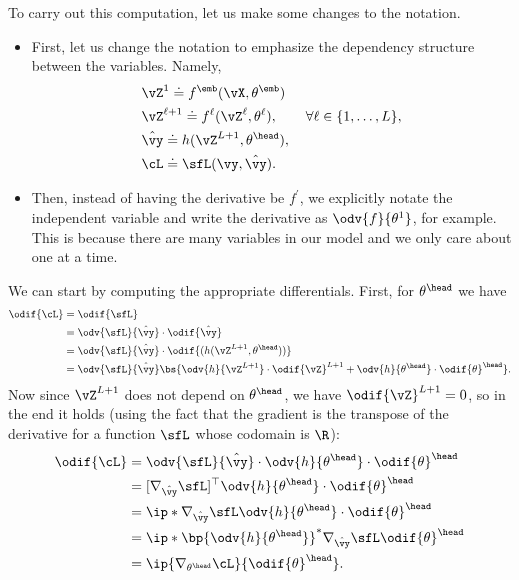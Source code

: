 \documentclass[../../book-main.tex]{subfiles}
\begin{document}
To carry out this computation, let us make some changes to the notation. 
\begin{itemize}
    \item First, let us change the notation to emphasize the dependency structure between the variables. Namely, 
    \begin{align}
        &\vZ^{1} \doteq f^{\emb}(\vX, \theta^{\emb}) \\ 
        &\vZ^{\ell + 1} \doteq f^{\ell}(\vZ^{\ell}, \theta^{\ell}), \qquad \forall \ell \in \{1, \dots, L\}, \\
        &\hat{\vy} \doteq h(\vZ^{L+1}, \theta^{\head}), \\ 
        &\cL \doteq \sfL(\vy, \hat{\vy}).
    \end{align}
    \item Then, instead of having the derivative be \(f^{\prime}\), we explicitly notate the independent variable and write the derivative as \(\odv{f}{\theta^{1}}\), for example. This is because there are many variables in our model and we only care about one at a time.
\end{itemize}
We can start by computing the appropriate differentials. First, for \(\theta^{\head}\) we have
\begin{align}
    \odif{\cL}
    &= \odif{\sfL} \\ 
    &= \odv{\sfL}{\hat{\vy}}\cdot\odif{\hat{\vy}} \\ 
    &= \odv{\sfL}{\hat{\vy}}\cdot\odif{{(h(\vZ^{L + 1}, \theta^{\head}))}} \\ 
    &= \odv{\sfL}{\hat{\vy}}\bs{\odv{h}{\vZ^{L + 1}}\cdot\odif{\vZ}^{L + 1} + \odv{h}{\theta^{\head}}\cdot\odif{\theta}^{\head}}.
\end{align}
Now since \(\vZ^{L + 1}\) does not depend on \(\theta^{\head}\), we have \(\odif{\vZ}^{L + 1} = 0\), so in the end it holds (using the fact that the gradient is the transpose of the derivative for a function \(\sfL\) whose codomain is \(\R\)):
\begin{align}
    \odif{\cL} 
    &= \odv{\sfL}{\hat{\vy}}\cdot\odv{h}{\theta^{\head}}\cdot\odif{\theta}^{\head} \\ 
    &= [\nabla_{\hat{\vy}}\sfL]^{\top}\odv{h}{\theta^{\head}}\cdot\odif{\theta}^{\head} \\ 
    &= \ip*{\nabla_{\hat{\vy}}\sfL}{\odv{h}{\theta^{\head}}\cdot\odif{\theta}^{\head}} \\
    &= \ip*{\bp{\odv{h}{\theta^{\head}}}^{*}\nabla_{\hat{\vy}}\sfL}{\odif{\theta}^{\head}} \\ 
    &= \ip{\nabla_{\theta^{\head}}\cL}{\odif{\theta}^{\head}}.
\end{align}
\end{document}
